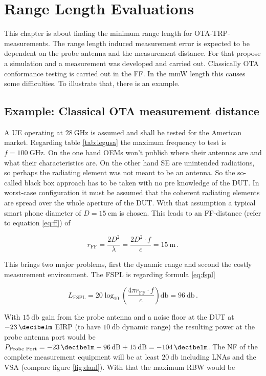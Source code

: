 \chapter{Range Length Evaluations}

This chapter is about finding the minimum range length for \ac{OTA}-\ac{TRP}-measurements. The range length induced measurement error is expected to be dependent on the probe antenna and the measurement distance. For that propose a simulation and a measurement was developed and carried out. Classically \ac{OTA} conformance testing is carried out in the \ac{FF}. In the \ac{mmW} length this causes some difficulties. To illustrate that, there is an example.

\section{Example: Classical OTA measurement distance}

A \ac{UE} operating at $\SI{28}{\giga\hertz}$ is assumed and shall be tested for the American market. Regarding table \ref{tab:legusa} the maximum frequency to test is $f = \SI{100}{\giga\hertz}$. On the one hand \acp{OEM} won't publish where their antennas are and what their characteristics are. On the other hand \ac{SE} are unintended radiations, so perhaps the radiating element was not meant to be an antenna. So the so-called black box approach has to be taken with no pre knowledge of the \ac{DUT}. In worst-case configuration it must be assumed that the coherent radiating elements are spread over the whole aperture of the \ac{DUT}. With that assumption a typical smart phone diameter of $D=\SI{15}{\centi\meter}$ is chosen. This leads to an \ac{FF}-distance (refer to equation \ref{eq:ff}) of 

\begin{equation}
r_{\text{FF}} = \frac{2D^2}{\lambda} = \frac{2D^2\cdot f}{c} = \SI{15}{\meter}\,.
\end{equation}

This brings two major problems, first the dynamic range and second the costly measurement environment. The \ac{FSPL} is regarding formula \ref{eq:fspl}

\begin{equation}
L_{\text{FSPL}} = 20\log_{10}\left(\frac{4\pi r_{\text{FF}} \cdot f}{c}\right)\si{\decibel} = \SI{96}{\decibel}\,.
\end{equation}

With $\SI{15}{\decibel}$ gain from the probe antenna and a noise floor at the \ac{DUT} at $\SI{-23}{\decibelm}$ \ac{EIRP} (to have $\SI{10}{\decibel}$ dynamic range) the resulting power at the probe antenna port would be $P_{\text{Probe Port}} = \SI{-23}{\decibelm}-\SI{96}{\decibel}+\SI{15}{\decibel}=\SI{-104}{\decibelm}$. The \ac{NF} of the complete measurement equipment will be at least $\SI{20}{\decibel}$ including \acp{LNA} and the \ac{VSA} (compare figure \ref{fig:danl}). With that the maximum \ac{RBW} would be 

